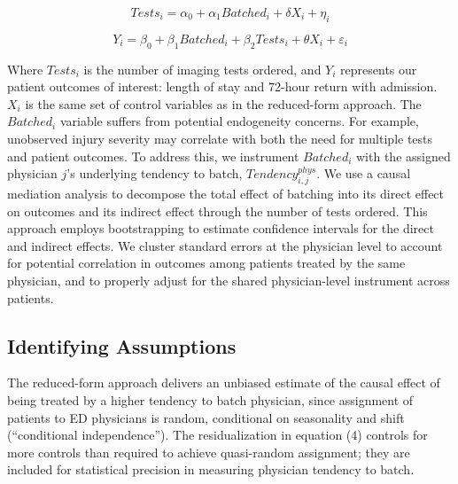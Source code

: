 \documentclass[,,nonblindrev]{informs}
\begin{document}
\begin{equation}
Tests_i = \alpha_0 + \alpha_1 Batched_i + \delta X_i + \eta_i
\end{equation}

\begin{equation}
Y_i = \beta_0 + \beta_1 Batched_i + \beta_2 Tests_i + \theta X_i + \varepsilon_i
\end{equation}

Where \(Tests_i\) is the number of imaging tests ordered, and \(Y_i\)
represents our patient outcomes of interest: length of stay and 72-hour
return with admission. \(X_i\) is the same set of control variables as
in the reduced-form approach. The \(Batched_i\) variable suffers from
potential endogeneity concerns. For example, unobserved injury severity
may correlate with both the need for multiple tests and patient
outcomes. To address this, we instrument \(Batched_i\) with the assigned
physician \(j\)'s underlying tendency to batch,
\(Tendency_{i,j}^{phys}\). We use a causal mediation analysis to
decompose the total effect of batching into its direct effect on
outcomes and its indirect effect through the number of tests ordered.
This approach employs bootstrapping to estimate confidence intervals for
the direct and indirect effects. We cluster standard errors at the
physician level to account for potential correlation in outcomes among
patients treated by the same physician, and to properly adjust for the
shared physician-level instrument across patients.

\hypertarget{identifying-assumptions}{%
\subsection{Identifying Assumptions}\label{identifying-assumptions}}

The reduced-form approach delivers an unbiased estimate of the causal
effect of being treated by a higher tendency to batch physician, since
assignment of patients to ED physicians is random, conditional on
seasonality and shift (``conditional independence''). The
residualization in equation (4) controls for more controls than required
to achieve quasi-random assignment; they are included for statistical
precision in measuring physician tendency to batch.
\end{document}
